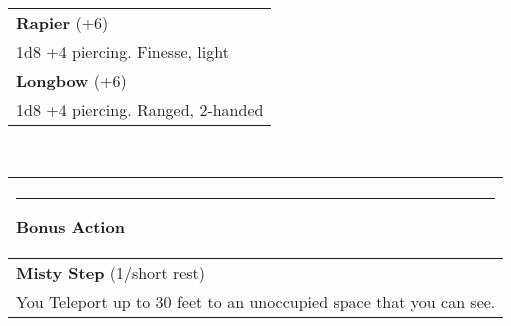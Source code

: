 \documentclass[twocolumn]{article}
\begin{document}
%

\vspace{40pt}

\\
\noindent\begin{tabular}{|m{3.1in}|}
\hline
\textbf{Rapier} (+6) \\
1d8 +4 piercing. Finesse, light \\
\textbf{Longbow} (+6) \\
1d8 +4 piercing. Ranged, 2-handed \\

\hline
\end{tabular}
\vspace{8pt}

\\
\noindent\begin{tabular}{|m{3.1in}|}
\hline
\rule{1.1in}{0pt}Bonus Action\\
\hline
\textbf{Misty Step} (1/short rest)\\
You Teleport up to 30 feet to an unoccupied space that you can see.\\
\hline
\end{tabular}
\vspace{8pt}
\end{document}
